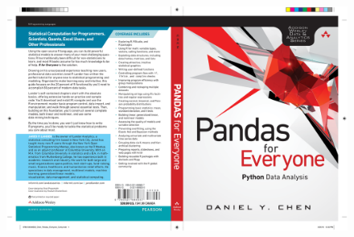 \documentclass[compress]{beamer}
\begin{document}
\begin{frame}[Basic2]
\begin{columns}
\begin{column}{0.43\textwidth}
                \begin{figure}
                    \centering
                    \includegraphics[width=0.8\linewidth]{../figures/pandas_for_everyone}
                    \caption{}
                    \label{fig:pandasforeveryone}
                \end{figure}
            \end{column}
        \end{columns}
    \end{frame}
\end{document}
